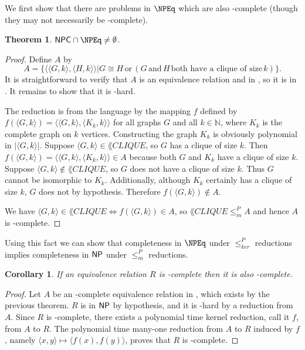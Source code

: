 \documentclass[draft]{article}
\newtheorem{theorem}{Theorem}[section]
\newtheorem{corollary}[corollary]{Corollary}
\theoremstyle{definition} \newtheorem{openproblem}[openproblem]{Open problem}
\theoremstyle{definition} \newtheorem{definition}[definition]{Definition}
\theoremstyle{remark} \newtheorem{remark}[remark]{Remark}
\newcommand{\plain}[1]{\,\text{#1}\,} %
\newcommand{\kr}{\leq^{P}_{ker}} %
\newcommand{\mor}{\leq^{P}_{m}} %
\newcommand{\pair}[2]{\langle#1,#2\rangle} %
\begin{document}
We first show that there are problems in $\NPEq$ which are also \NP-complete (though they may not necessarily be \NPEq-complete).

\begin{theorem}\label{thm:npcnpeq}
  $\NPC\cap\NPEq\neq\emptyset$.
\end{theorem}
\begin{proof}
  Define $A$ by
  \begin{displaymath}
    A=\{\pair{\pair{G}{k}}{\pair{H}{k}}|G\cong H \plain{or} (G \plain{and} H \plain{both have a clique of size} k)\}.
  \end{displaymath}
  It is straightforward to verify that $A$ is an equivalence relation and in \NP, so it is in \NPEq.
  It remains to show that it is \NP-hard.

  The reduction is from the language  by the mapping $f$ defined by $f(\pair{G}{k})=\pair{\pair{G}{k}}{\pair{K_k}{k}}$ for all graphs $G$ and all $k\in\mathbb{N}$, where $K_k$ is the complete graph on $k$ vertices.
  Constructing the graph $K_k$ is obviously polynomial in $|\pair{G}{k}|$.
  Suppose $\pair{G}{k}\in \lang{CLIQUE}$, so $G$ has a clique of size $k$.
  Then $f(\pair{G}{k})=\pair{\pair{G}{k}}{\pair{K_k}{k}}\in A$ because both $G$ and $K_k$ have a clique of size $k$.
  Suppose $\pair{G}{k}\notin \lang{CLIQUE}$, so $G$ does not have a clique of size $k$.
  Thus $G$ cannot be isomorphic to $K_k$.
  Additionally, although $K_k$ certainly has a clique of size $k$, $G$ does not by hypothesis.
  Therefore $f(\pair{G}{k})\notin A$.

  We have $\pair{G}{k}\in \lang{CLIQUE} \iff f(\pair{G}{k})\in A$, so $\lang{CLIQUE}\mor A$ and hence $A$ is \NP-complete.
\end{proof}

Using this fact we can show that completeness in $\NPEq$ under $\kr$ reductions implies completeness in ${\mathsf{NP}}$ under $\mor$ reductions.

\begin{corollary}
  If an equivalence relation $R$ is \NPEq-complete then it is also \NP-complete.
\end{corollary}
\begin{proof}
  Let $A$ be an \NP-complete equivalence relation in \NPEq, which exists by the previous theorem.
  $R$ is in ${\mathsf{NP}}$ by hypothesis, and it is \NP-hard by a reduction from $A$.
  Since $R$ is \NPEq-complete, there exists a polynomial time kernel reduction, call it $f$, from $A$ to $R$.
  The polynomial time many-one reduction from $A$ to $R$ induced by $f$, namely $\pair{x}{y}\mapsto\pair{f(x)}{f(y)}$, proves that $R$ is \NP-complete.
\end{proof}
\end{document}

